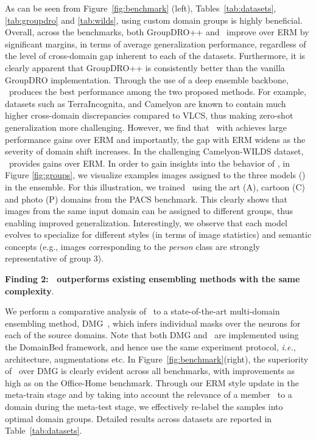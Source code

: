 \noindent As can be seen from Figure~\ref{fig:benchmark} (left), Tables~\ref{tab:datasets}, \ref{tab:groupdro} and \ref{tab:wilds}, using custom domain groups is highly beneficial. Overall, across the benchmarks, both GroupDRO++ and \muld~improve over ERM by significant margins, in terms of average generalization performance, regardless of the level of cross-domain gap inherent to each of the datasets. Furthermore, it is clearly apparent that GroupDRO++ is consistently better than the vanilla GroupDRO implementation. Through the use of a deep ensemble backbone, \muld~produces the best performance among the two proposed methods. For example, datasets such as TerraIncognita, and Camelyon are known to contain much higher cross-domain discrepancies compared to VLCS, thus making zero-shot generalization more challenging. However, we find that \muld~with  achieves large performance gains over ERM and importantly, the gap with ERM widens as the severity of domain shift increases. In the challenging Camelyon-WILDS dataset, \muld~provides  gains over ERM. In order to gain insights into the behavior of \muld, in Figure \ref{fig:groups}, we visualize examples images assigned to the three models () in the ensemble. For this illustration, we trained \muld~using the art (A), cartoon (C) and photo (P) domains from the PACS benchmark. This clearly shows that images from the same input domain can be assigned to different groups, thus enabling improved generalization. Interestingly, we observe that each model evolves to specialize for different styles (in terms of image statistics) and semantic concepts (e.g., images corresponding to the \textit{person} class are strongly representative of group 3). 




\vspace{0.05in}
\noindent\textbf{Finding 2: \muld~outperforms existing ensembling methods with the same complexity}.

\noindent We perform a comparative analysis of \muld~to a state-of-the-art multi-domain ensembling method, DMG~\citep{DMG}, which infers individual masks over the neurons for each of the source domains. Note that both DMG and \muld~are implemented using the DomainBed framework, and hence use the same experiment protocol, \textit{i.e.}, architecture, augmentations etc.
In Figure~\ref{fig:benchmark}(right), the superiority of \muld~over DMG is clearly evident across all benchmarks, with improvements as high as  on the Office-Home benchmark. Through our ERM style update in the meta-train stage and by taking into account the relevance of a member \wrt~to a domain during the meta-test stage, we effectively re-label the samples into optimal domain groups. Detailed results across datasets are reported in Table~\ref{tab:datasets}.


